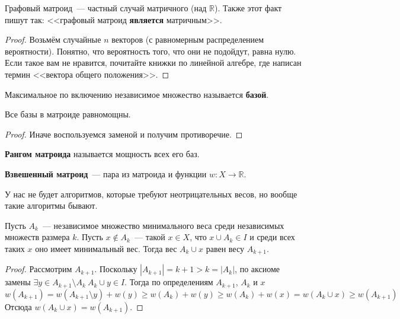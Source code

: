 \documentclass{article}
\begin{document}
    \begin{theorem}
        Графовый матроид~--- частный случай матричного (над $\mathbb R$). Также этот факт пишут так: <<графовый матроид \textbf{является} матричным>>.
    \end{theorem}
    \begin{proof}
        Возьмём случайные $n$ векторов (с равномерным распределением вероятности). Понятно, что вероятность того, что они не подойдут, равна нулю.\\
        Если такое вам не нравится, почитайте книжки по линейной алгебре, где написан термин <<вектора общего положения>>.
    \end{proof}
    \begin{definition}
        Максимальное по включению независимое множество называется \textbf{базой}.
    \end{definition}
    \begin{lemma}
        Все базы в матроиде равномощны.
    \end{lemma}
    \begin{proof}
        Иначе воспользуемся заменой и получим противоречие.
    \end{proof}
    \begin{definition}
        \textbf{Рангом матроида} называется мощность всех его баз.
    \end{definition}
    \begin{definition}
        \textbf{Взвешенный матроид}~--- пара из матроида и функции $w\colon X\to\mathbb R$.
    \end{definition}
    \begin{remark}
        У нас не будет алгоритмов, которые требуют неотрицательных весов, но вообще такие алгоритмы бывают.
    \end{remark}
    \begin{lemma}
        Пусть $A_k$~--- независимое множество минимального веса среди независимых множеств размера $k$. Пусть $x\notin A_k$~--- такой $x\in X$, что $x\cup A_k\in I$ и среди всех таких $x$ оно имеет минимальный вес. Тогда вес $A_k\cup x$ равен весу $A_{k+1}$.
    \end{lemma}
    \begin{proof}
        Рассмотрим $A_{k+1}$. Поскольку $|A_{k+1}|=k+1>k=|A_k|$, по аксиоме замены $\exists y\in A_{k+1}\setminus A_k~A_k\cup y\in I$. Тогда по определениям $A_{k+1}$, $A_k$ и $x$
        $$
        w(A_{k+1})=w(A_{k+1}\setminus y)+w(y)\geqslant w(A_k)+w(y)\geqslant w(A_k)+w(x)=w(A_k\cup x)\geqslant w(A_{k+1})
        $$
        Отсюда $w(A_k\cup x)=w(A_{k+1})$.
    \end{proof}
\end{document}
